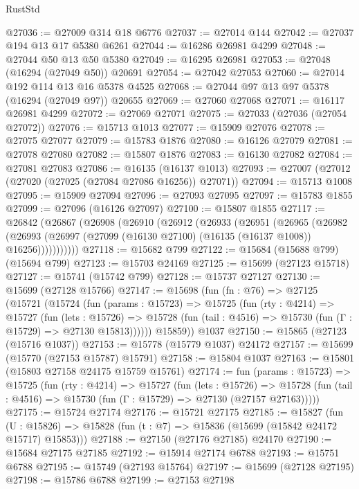 \begin{lexlean}{RustStd}
\begin{coremodule}
@27036 := @27009 @314 @18 @6776
@27037 := @27014 @144
@27042 := @27037 @194 @13 @17 @5380 @6261
@27044 := @16286 @26981 @4299
@27048 := @27044 @50 @13 @50 @5380
@27049 := @16295 @26981
@27053 := @27048 (@16294 (@27049 @50)) @20691
@27054 := @27042 @27053
@27060 := @27014 @192 @114 @13 @16 @5378 @4525
@27068 := @27044 @97 @13 @97 @5378 (@16294 (@27049 @97)) @20655
@27069 := @27060 @27068
@27071 := @16117 @26981 @4299
@27072 := @27069 @27071
@27075 := @27033 (@27036 (@27054 @27072))
@27076 := @15713 @1013
@27077 := @15909 @27076
@27078 := @27075 @27077
@27079 := @15783 @1876
@27080 := @16126 @27079
@27081 := @27078 @27080
@27082 := @15807 @1876
@27083 := @16130 @27082
@27084 := @27081 @27083
@27086 := @16135 (@16137 @1013)
@27093 := @27007 (@27012 (@27020 (@27025 (@27084 @27086 @16256)) @27071))
@27094 := @15713 @1008
@27095 := @15909 @27094
@27096 := @27093 @27095
@27097 := @15783 @1855
@27099 := @27096 (@16126 @27097)
@27100 := @15807 @1855
@27117 := @26842
    (@26867
      (@26908
        (@26910
          (@26912
            (@26933
              (@26951
                (@26965
                  (@26982
                    (@26993
                      (@26997 (@27099 (@16130 @27100) (@16135 (@16137 @1008)) @16256)))))))))))
@27118 := @15682 @799
@27122 := @15684 (@15688 @799) (@15694 @799)
@27123 := @15703 @24169
@27125 := @15699 (@27123 @15718)
@27127 := @15741 (@15742 @799)
@27128 := @15737 @27127
@27130 := @15699 (@27128 @15766)
@27147 := @15698
    (fun (fn : @76) =>
    @27125
      (@15721
        (@15724
          (fun (params : @15723) =>
          @15725
            (fun (rty : @4214) =>
            @15727
              (fun (lets : @15726) =>
              @15728 (fun (tail : @4516) => @15730 (fun (Γ : @15729) => @27130 @15813))))))
        @15859))
    @1037
@27150 := @15865 (@27123 (@15716 @1037))
@27153 := @15778 (@15779 @1037) @24172
@27157 := @15699 (@15770 (@27153 @15787) @15791)
@27158 := @15804 @1037
@27163 := @15801 (@15803 @27158 @24175 @15759 @15761)
@27174 := fun (params : @15723) =>
  @15725
    (fun (rty : @4214) =>
    @15727
      (fun (lets : @15726) =>
      @15728 (fun (tail : @4516) => @15730 (fun (Γ : @15729) => @27130 (@27157 @27163)))))
@27175 := @15724 @27174
@27176 := @15721 @27175
@27185 := @15827
    (fun (U : @15826) => @15828 (fun (t : @7) => @15836 (@15699 (@15842 @24172 @15717) @15853)))
@27188 := @27150 (@27176 @27185) @24170
@27190 := @15684 @27175 @27185
@27192 := @15914 @27174 @6788
@27193 := @15751 @6788
@27195 := @15749 (@27193 @15764)
@27197 := @15699 (@27128 @27195)
@27198 := @15786 @6788
@27199 := @27153 @27198

\end{coremodule}
\end{lexlean}
